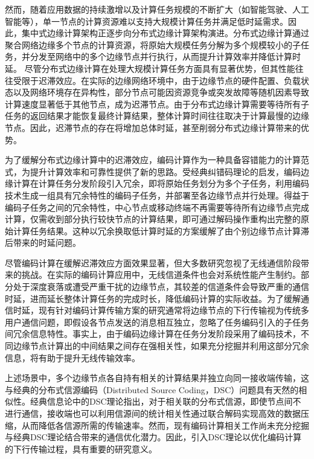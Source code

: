 然而，随着应用数据的持续激增以及计算任务规模的不断扩大（如智能驾驶、人工智能等），单一节点的计算资源难以支持大规模计算任务并满足低时延需求。因此，集中式边缘计算架构正逐步向分布式边缘计算架构演进。分布式边缘计算通过聚合网络边缘多个节点的计算资源，将原始大规模任务分解为多个规模较小的子任务，并分发至网络中的多个边缘节点并行执行，从而提升计算效率并降低计算时延。
尽管分布式边缘计算在处理大规模计算任务方面具有显著优势，但其性能往往受限于迟滞效应。在实际的边缘网络环境中，由于边缘节点的硬件配置、负载状态以及网络环境存在异构性，部分节点可能因资源竞争或突发故障等随机因素导致计算速度显著低于其他节点，成为迟滞节点。由于分布式边缘计算需要等待所有子任务的返回结果才能恢复最终计算结果，整体计算时间往往取决于计算最慢的边缘节点。因此，迟滞节点的存在将增加总体时延，甚至削弱分布式边缘计算带来的优势。

为了缓解分布式边缘计算中的迟滞效应，编码计算作为一种具备容错能力的计算范式，为提升计算效率和可靠性提供了新的思路。受经典纠错码理论的启发，编码边缘计算在计算任务分发阶段引入冗余，即将原始任务划分为多个子任务，利用编码技术生成一组具有冗余特性的编码子任务，并部署至各边缘节点并行处理。得益于编码子任务之间的冗余特性，中心节点或移动终端不再需要等待所有边缘节点完成计算，仅需收到部分执行较快节点的计算结果，即可通过解码操作重构出完整的原始计算任务结果。这种以冗余换取低计算时延的方案缓解了由个别边缘节点计算滞后带来的时延问题。

尽管编码计算在缓解迟滞效应方面效果显著，但大多数研究忽视了无线通信阶段带来的挑战。在实际的编码计算应用中，无线信道条件也会对系统性能产生制约。部分处于深度衰落或遭受严重干扰的边缘节点，其较差的信道条件会导致严重的通信时延，进而延长整体计算任务的完成时长，降低编码计算的实际收益。为了缓解通信时延，现有针对编码计算传输方案的研究通常将边缘节点的下行传输视为传统多用户通信问题，即假设各节点发送的消息相互独立，忽略了任务编码引入的子任务间冗余信息特性。事实上，由于编码边缘计算在任务分发阶段采用了编码技术，不同边缘节点计算出的中间结果之间存在强相关性，如果充分挖掘并利用这部分冗余信息，将有助于提升无线传输效率。

上述场景中，多个边缘节点各自持有相关的计算结果并独立向同一接收端传输，这与经典的分布式信源编码（Distributed Source Coding，DSC）问题具有天然的相似性。经典信息论中的DSC理论指出，对于相关联的分布式信源，即使节点间不进行通信，接收端也可以利用信源间的统计相关性通过联合解码实现高效的数据压缩，从而降低各信源所需的传输速率。然而，现有编码计算相关工作尚未充分挖掘与经典DSC理论结合带来的通信优化潜力。因此，引入DSC理论以优化编码计算的下行传输过程，具有重要的研究意义。

